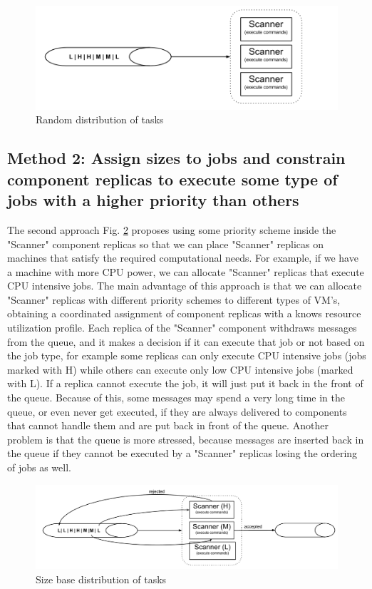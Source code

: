 \begin{figure}[ht]
\centering
\includegraphics[width=\linewidth]{./img/1_NaturalLoadBalancing.png}
\caption{Random distribution of tasks}
\label{fig:randomDistributionsOfTasks}
\end{figure}

\subsection{Method 2: Assign sizes to jobs and constrain component replicas to execute some type of jobs with a higher priority than others}
\label{subsection:method2}
The second approach Fig. \ref{fig:sizeBaseDistributionOftasks} proposes using some priority scheme inside the "Scanner" component replicas so that we can place "Scanner" replicas on machines that satisfy the required computational needs. For example, if we have a machine with more CPU power, we can allocate "Scanner" replicas that execute CPU intensive jobs. The main advantage of this approach is that we can allocate "Scanner" replicas with different priority schemes to different types of VM's, obtaining a coordinated assignment of component replicas with a knows resource utilization profile. Each replica of the "Scanner" component withdraws messages from the queue, and it makes a decision if it can execute that job or not based on the job type, for example some replicas can only execute CPU intensive jobs (jobs marked with H) while others can execute only low CPU intensive jobs (marked with L). If a replica cannot execute the job, it will just put it back in the front of the queue. Because of this, some messages may spend a very long time in the queue, or even never get executed, if they are always delivered to components that cannot handle them and are put back in front of the queue. Another problem is that the queue is more stressed, because messages are inserted back in the queue if they cannot be executed by a "Scanner" replicas losing the ordering of jobs as well.

\begin{figure}[ht]
\centering
\includegraphics[width=\linewidth]{./img/2_PriorityLoadBalancing.png}
\caption{Size base distribution of tasks}
\label{fig:sizeBaseDistributionOftasks}
\end{figure}


